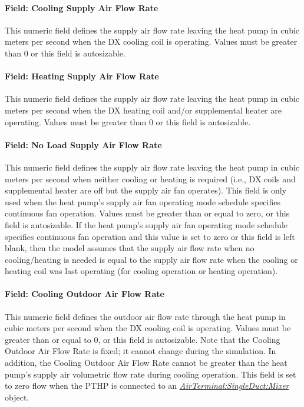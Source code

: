 \paragraph{Field: Cooling Supply Air Flow Rate}\label{field-cooling-supply-air-flow-rate-1-001}

This numeric field defines the supply air flow rate leaving the heat pump in cubic meters per second when the DX cooling coil is operating. Values must be greater than 0 or this field is autosizable.

\paragraph{Field: Heating Supply Air Flow Rate}\label{field-heating-supply-air-flow-rate-1-001}

This numeric field defines the supply air flow rate leaving the heat pump in cubic meters per second when the DX heating coil and/or supplemental heater are operating. Values must be greater than 0 or this field is autosizable.

\paragraph{Field: No Load Supply Air Flow Rate}\label{field-no-load-supply-air-flow-rate-1-001}

This numeric field defines the supply air flow rate leaving the heat pump in cubic meters per second when neither cooling or heating is required (i.e., DX coils and supplemental heater are off but the supply air fan operates). This field is only used when the heat pump's supply air fan operating mode schedule specifies continuous fan operation. Values must be greater than or equal to zero, or this field is autosizable. If the heat pump's supply air fan operating mode schedule specifies continuous fan operation and this value is set to zero or this field is left blank, then the model assumes that the supply air flow rate when no cooling/heating is needed is equal to the supply air flow rate when the cooling or heating coil was last operating (for cooling operation or heating operation).

\paragraph{Field: Cooling Outdoor Air Flow Rate}\label{field-cooling-outdoor-air-flow-rate-1}

This numeric field defines the outdoor air flow rate through the heat pump in cubic meters per second when the DX cooling coil is operating. Values must be greater than or equal to 0, or this field is autosizable. Note that the Cooling Outdoor Air Flow Rate is fixed; it cannot change during the simulation. In addition, the Cooling Outdoor Air Flow Rate cannot be greater than the heat pump's supply air volumetric flow rate during cooling operation.
This field is set to zero flow when the PTHP is connected to an \textit{\hyperref[airterminalsingleductmixer]{AirTerminal:SingleDuct:Mixer}} object.

